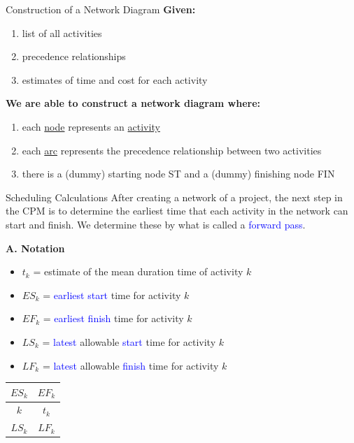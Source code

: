 \documentclass[11pt,aspectratio=169]{beamer}
\begin{document}
\begin{frame}{Construction of a Network Diagram}
    \textbf{Given:}
    \begin{enumerate}[(1)]
        \item list of all activities
        \item precedence relationships
        \item estimates of time and cost for each activity
    \end{enumerate}
    \vspace{1em}
    \textbf{We are able to construct a network diagram where:}
    \begin{enumerate}[(1)]
        \item each \underline{node} represents an \underline{activity}
        \item each \underline{arc} represents the precedence relationship between two activities
        \item there is a (dummy) starting node ST and a (dummy) finishing node FIN
    \end{enumerate}
\end{frame}

\begin{frame}{Scheduling Calculations}
    After creating a network of a project, the next step in the CPM is to determine the earliest time that each activity in the network can start and finish. We determine these by what is called a \textcolor{blue}{forward pass}.
    
    \vspace{1em}
    \textbf{A. Notation}
    \begin{itemize}
        \item $t_k$ = estimate of the mean duration time of activity $k$
        \item $ES_k$ = \textcolor{blue}{earliest start} time for activity $k$
        \item $EF_k$ = \textcolor{blue}{earliest finish} time for activity $k$
        \item $LS_k$ = \textcolor{blue}{latest} allowable \textcolor{blue}{start} time for activity $k$
        \item $LF_k$ = \textcolor{blue}{latest} allowable \textcolor{blue}{finish} time for activity $k$
    \end{itemize}
    \vspace{1em}
    \begin{center}
    \begin{tabular}{|c|c|}
    \hline
    $ES_k$ & $EF_k$ \\ \hline
    $k$ & $t_k$ \\ \hline
    $LS_k$ & $LF_k$ \\ \hline
    \end{tabular}
    \end{center}
\end{frame}
\end{document}
